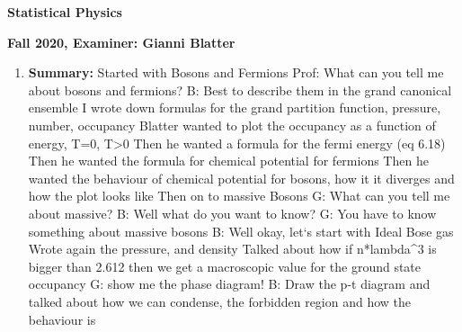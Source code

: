 \documentclass{article}%
\begin{document}
%
\normalsize%
\begin{center}%
\begin{Large}%
\textbf{Statistical Physics}%
\end{Large}%
\linebreak%
\end{center}%
\begin{center}%
\begin{large}%
\textbf{Fall 2020, Examiner: Gianni Blatter}%
\end{large}%
\end{center}%
\begin{enumerate}%
\item%
\begin{mycolorbox}%
\textbf{Summary:}%
\newline%
Started with Bosons and Fermions\newline%
 Prof: What can you tell me about bosons and fermions?\newline%
 B: Best to describe them in the grand canonical ensemble\newline%
 I wrote down formulas for the grand partition function, pressure, number, occupancy\newline%
 Blatter wanted to plot the occupancy as a function of energy, T=0, T>0\newline%
 Then he wanted a formula for the fermi energy (eq 6.18)\newline%
 Then he wanted the formula for chemical potential for fermions\newline%
 Then he wanted the behaviour of chemical potential for bosons, how it it diverges and how the plot looks like\newline%
 Then on to massive Bosons\newline%
 G: What can you tell me about massive?\newline%
 B: Well what do you want to know?\newline%
 G: You have to know something about massive bosons\newline%
 B: Well okay, let‘s start with Ideal Bose gas\newline%
 Wrote again the pressure, and density\newline%
 Talked about how if n*lambda\^{}3 is bigger than 2.612 then we get a macroscopic value for the ground state occupancy\newline%
 G: show me the phase diagram!\newline%
 B: Draw the p{-}t diagram and talked about how we can condense, the forbidden region and how the behaviour is\newline%

\end{mycolorbox}
\end{enumerate}
\end{document}
